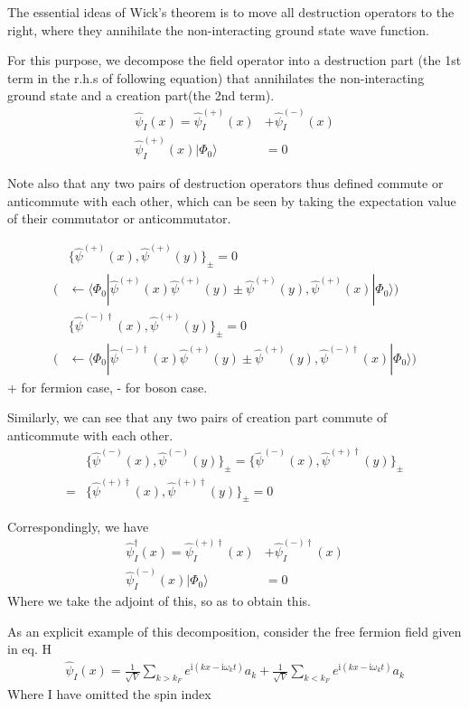The essential ideas of Wick's theorem is to move all destruction operators to the right, where they annihilate the non-interacting ground state wave function.

For this purpose, we decompose the field operator into a destruction part (the 1st term in the r.h.s of following equation) that annihilates the non-interacting ground state and a creation part(the 2nd term).
\begin{align}
\hat \psi_{I}(x)=\hat \psi^{(+)}_{I}(x)&+\hat \psi^{(-)}_{I}(x) \nonumber \\
\hat \psi^{(+)}_{I}(x)|\Phi_0\rangle&=0 \nonumber
\end{align}

Note also that any two pairs of destruction operators thus defined commute or anticommute with each other, which can be seen by taking the expectation value of their commutator or anticommutator.

\begin{align}
&\{\hat \psi^{(+)}(x),\hat \psi^{(+)}(y)\}_{\pm}=0 \nonumber \\
\big (&\leftarrow\langle\Phi_0|\hat \psi^{(+)}(x)\hat \psi^{(+)}(y)\pm\hat \psi^{(+)}(y),\hat \psi^{(+)}(x)|\Phi_0\rangle \big) \nonumber \\
&\{\hat \psi^{(-)\dagger}(x),\hat \psi^{(+)}(y)\}_{\pm}=0 \nonumber \\
\big (&\leftarrow\langle\Phi_0|\hat \psi^{(-)\dagger}(x)\hat \psi^{(+)}(y)\pm\hat \psi^{(+)}(y),\hat \psi^{(-)\dagger}(x)|\Phi_0\rangle \big) \nonumber
\end{align} 
+ for fermion case, - for boson case.

Similarly, we can see that any two pairs of creation part commute of anticommute with each other.
\begin{align}
&\{\hat \psi^{(-)}(x),\hat \psi^{(-)}(y)\}_{\pm}=\{\hat \psi^{(-)}(x),\hat \psi^{(+)\dagger}(y)\}_{\pm} \nonumber \\
=&\{\hat \psi^{(+)\dagger}(x),\hat \psi^{(+)\dagger}(y)\}_{\pm}=0 \nonumber 
\end{align}

Correspondingly, we have
\begin{align}
\hat \psi^{\dagger}_{I}(x)=\hat \psi^{(+)\dagger}_{I}(x)&+\hat \psi^{(-)\dagger}_{I}(x) \nonumber \\
\hat \psi^{(-)}_{I}(x)|\Phi_0\rangle&=0 \nonumber
\end{align}
Where we take the adjoint of this, so as to obtain this.

As an explicit example of this decomposition, consider the free fermion field given in eq. H
\begin{align}
\hat \psi_I(x)=\frac{1}{\sqrt{V}}\sum_{k>k_F} e^{\mathrm{i}(kx-\mathrm{i}\omega_kt)}a_k+\frac{1}{\sqrt{V}}\sum_{k<k_F} e^{\mathrm{i}(kx-\mathrm{i}\omega_kt)}a_k \nonumber
\end{align}
Where I have omitted the spin index

